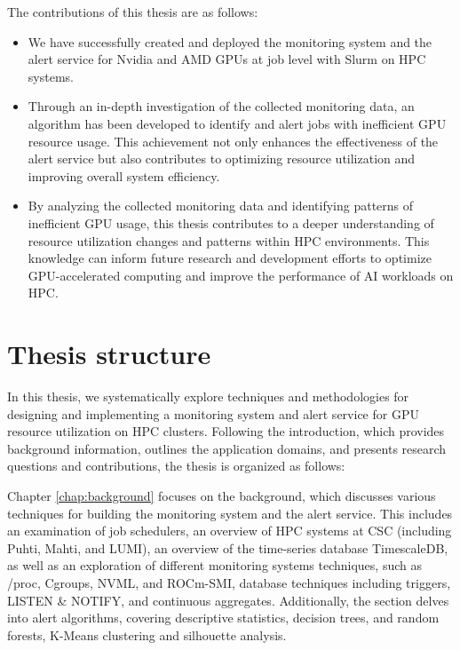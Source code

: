The contributions of this thesis are as follows:

\begin{itemize}
    \item We have successfully created and deployed the monitoring system and the alert service for Nvidia and AMD GPUs at job level with Slurm on HPC systems.
    \item Through an in-depth investigation of the collected monitoring data, an algorithm has been developed to identify and alert jobs with inefficient GPU resource usage. This achievement not only enhances the effectiveness of the alert service but also contributes to optimizing resource utilization and improving overall system efficiency.
    \item By analyzing the collected monitoring data and identifying patterns of inefficient GPU usage, this thesis contributes to a deeper understanding of resource utilization changes and patterns within HPC environments. This knowledge can inform future research and development efforts to optimize GPU-accelerated computing and improve the performance of AI workloads on HPC.
\end{itemize}

\section{Thesis structure}

In this thesis, we systematically explore techniques and methodologies for designing and implementing a monitoring system and alert service for GPU resource utilization on HPC clusters. Following the introduction, which provides background information, outlines the application domains, and presents research questions and contributions, the thesis is organized as follows:

Chapter \ref{chap:background} focuses on the background, which discusses various techniques for building the monitoring system and the alert service. This includes an examination of job schedulers, an overview of HPC systems at CSC (including Puhti, Mahti, and LUMI), an overview of the time-series database TimescaleDB, as well as an exploration of different monitoring systems techniques, such as /proc, Cgroups, NVML, and ROCm-SMI, database techniques including triggers, LISTEN \& NOTIFY, and continuous aggregates. Additionally, the section delves into alert algorithms, covering descriptive statistics, decision trees, and random forests, K-Means clustering and silhouette analysis.

